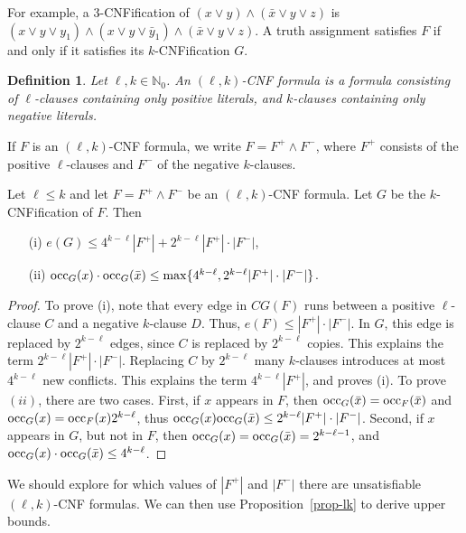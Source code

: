 \documentclass[a4paper, 11pt]{article}
\newtheorem{definition}[theorem]{Definition}
\newcommand{\occ}{\ensuremath{{\rm{occ}}}}
\begin{document}
For example, a $3$-CNFification of $(x \vee y) \wedge (\bar{x} \vee
y \vee z)$ is $(x \vee y \vee y_1) \wedge (x \vee y \vee \bar{y}_1)
\wedge (\bar{x} \vee y \vee z)$. A truth
assignment satisfies $F$ if and only if it satisfies its
$k$-CNFification $G$.

\begin{definition}
  Let $\ell, k \in \mathbb{N}_0$. An $(\ell,k)$-CNF formula is a
  formula consisting of $\ell$-clauses containing only positive
  literals, and $k$-clauses containing only negative literals.
\end{definition}

If $F$ is an $(\ell,k)$-CNF formula, we write $F=F^+ \wedge F^-$,
where $F^+$ consists of the positive $\ell$-clauses and $F^-$ of
the negative $k$-clauses.

\begin{proposition}
  Let $\ell \leq k$ and let $F=F^+ \wedge F^-$ be an $(\ell,k)$-CNF
  formula.  Let $G$ be the $k$-CNFification of $F$. Then
  \begin{itemize}
    \item[(i)] $e(G) \leq 4^{k-\ell}|F^+| + 2^{k-\ell}|F^+|\cdot|F^-|$,
    \item[(ii)] $\occ_G(x) \cdot \occ_G(\bar{x}) \leq
      \max\{4^{k-\ell}, 2^{k-\ell}|F^+|\cdot|F^-|\}$.
  \end{itemize}
\label{prop-lk}
\end{proposition}

\begin{proof}
  To prove (i), note that every edge in $CG(F)$ runs between a
  positive $\ell$-clause $C$ and a negative $k$-clause $D$. Thus,
  $e(F) \leq |F^+|\cdot|F^-|$.  In $G$, this edge is replaced by
  $2^{k-\ell}$ edges, since $C$ is replaced by $2^{k-\ell}$ copies.
  This explains the term $2^{k-\ell}|F^+|\cdot|F^-|$. Replacing $C$ by
  $2^{k-\ell}$ many $k$-clauses introduces at most $4^{k-\ell}$ new
  conflicts. This explains the term $4^{k-\ell}|F^+|$, and proves (i).
  To prove $(ii)$, there are two cases. First, if $x$ appears in $F$,
  then $\occ_G(\bar{x}) = \occ_F(\bar{x})$ and $\occ_G(x) =
  \occ_F(x)2^{k-\ell}$, thus $\occ_G(x)\occ_G(\bar{x}) \leq
  2^{k-\ell}|F^+|\cdot|F^-|$. Second, if $x$ appears in $G$, but not
  in $F$, then $\occ_G(x) = \occ_G(\bar{x}) = 2^{k-\ell-1}$, and
  $\occ_G(x) \cdot \occ_G(\bar{x}) \leq 4^{k-\ell}$.
\end{proof}

We should explore for which values of $|F^+|$ and $|F^-|$ there are
unsatisfiable $(\ell,k)$-CNF formulas. We can then use
Proposition~\ref{prop-lk} to derive upper bounds.
\end{document}
